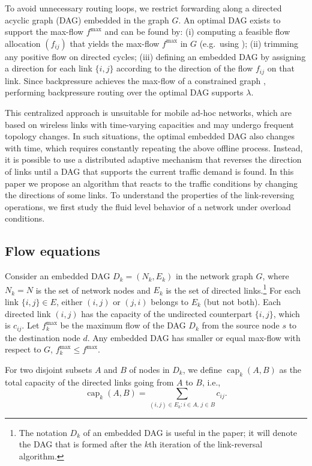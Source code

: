 \documentclass{sig-alternate-2013}
\newcommand{\capp}{\operatorname{cap}}
\begin{document}
To avoid unnecessary routing loops, we restrict forwarding along a directed acyclic graph (DAG) embedded in the graph $G$. 
An optimal DAG exists to support the max-flow $f^{\max}$ and can be found by: 
(i) computing a feasible flow allocation $(f_{ij})$ that yields the max-flow $f^{\max}$ in  $G$ (e.g.~using \cite{FordFulkerson}); 
(ii) trimming any positive flow on  directed cycles; 
(iii) defining an embedded DAG by assigning  a direction for each link $\{i, j\}$ according to the direction of the flow $f_{ij}$ on that link. 
Since backpressure achieves the max-flow of a constrained graph \cite{neely_georgiadis}, performing backpressure routing over the optimal DAG supports $\lambda$.



This centralized approach is unsuitable for mobile ad-hoc networks, which are based on wireless links with  time-varying  capacities and may undergo frequent topology changes. 
In such situations,  the  optimal embedded DAG  also changes with time, which  requires  constantly repeating the above offline process.
Instead, 
it is possible to use a distributed  adaptive mechanism that   reverses the direction of links until  a DAG that supports the current traffic demand is found.
In this paper we propose  an  algorithm that  reacts to the traffic conditions by changing the directions of some links. 
 To understand the properties of 
the link-reversing operations, we first study the fluid level behavior of a network under overload conditions.

\subsection{Flow equations}

Consider an embedded DAG $D_{k} = (N_{k}, E_{k})$ in the network graph $G$, where $N_{k} = N$ is the set of network nodes and $E_{k}$ is the set of directed links.\footnote{The notation $D_{k}$ of an embedded DAG is useful in the paper; it will denote the DAG that is formed after the $k$th iteration of the link-reversal algorithm.} For each link $\{i, j\}\in E$, either $(i, j)$ or $(j, i)$ belongs to $E_{k}$ (but not both). Each directed link $(i, j)$ has the capacity of the undirected counterpart $\{i,j\}$, which is $c_{ij}$.
Let $f^{\max}_{k}$ be the maximum flow of the DAG $D_{k}$ from the source node $s$ to the destination node $d$.
Any embedded DAG has smaller or equal max-flow with respect to $G$,  $f^{\max}_{k}\leq f^{\max}.$ 

For two disjoint subsets $A$ and $B$ of nodes in $D_{k}$, we define $\capp_k(A, B)$ as the total capacity of the directed links going from $A$ to $B$, i.e.,
\begin{equation} \label{eq:202}
\capp_k(A, B) = \sum_{(i, j) \in E_{k}: i\in A,\, j\in B} c_{ij}.
\end{equation}
\end{document}
